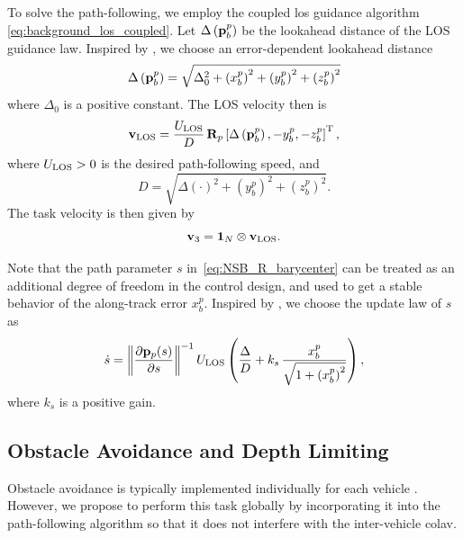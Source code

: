 To solve the path-following, we employ the coupled \gls{los} guidance algorithm \eqref{eq:background_los_coupled}.
Let $\Delta\left(\mathbf{p}_b^p\right)$ be the lookahead distance of the LOS guidance law.
Inspired by \cite{belleter_2019_observer}, we choose an error-dependent lookahead distance 
\begin{equation}
    \Delta\left(\mathbf{p}_b^p\right) = \sqrt{\Delta_0^2 + \left(x_b^p\right)^2 + \left(y_b^p\right)^2 + \left(z_b^p\right)^2}
    \label{eq:NSB_R_delta}
\end{equation}
where $\Delta_0$ is a positive constant.
The LOS velocity then is 
\begin{equation}
    \mathbf{v}_{\rm LOS} = \frac{U_{\rm LOS}}{D} \, \mathbf{R}_p\left[\Delta\left(\mathbf{p}_b^p\right), -y_b^p, -z_b^p\right]^{\mathrm{T}},
    \label{eq:NSB_R_v_LOS}
\end{equation}
where $U_{\rm LOS} > 0$ is the desired path-following speed, and 
\begin{equation}
    D = \sqrt{\Delta(\cdot)^2 + \left(y_b^p\right)^2 + \left(z_b^p\right)^2}.
\end{equation}
The task velocity is then given by 
\begin{equation}
    \mathbf{v}_3 = \mathbf{1}_N \otimes \mathbf{v}_{\rm LOS}.
    \label{eq:NSB_R_v_3}
\end{equation}

Note that the path parameter $s$ in~\eqref{eq:NSB_R_barycenter} can be treated as an additional degree of freedom in the control design, and used to get a stable behavior of the along-track error $x_b^p$. 
Inspired by \cite{belleter_2019_observer}, we choose the update law of $s$ as
\begin{equation}
    \dot{s} = \left\|\frac{\partial \mathbf{p}_p(s)}{\partial s}\right\|^{-1} U_{\rm LOS} \left(\frac{\Delta}{D} + k_{s}\,\frac{x_b^p}{\sqrt{1+\left(x_b^p\right)^2}}\right),\label{eq:NSB_R_path_update}
\end{equation}
where $k_{s}$ is a positive gain.


\subsection{Obstacle Avoidance and Depth Limiting}
\label{sec:NSB_R_OA}

Obstacle avoidance is typically implemented individually for each vehicle \cite{antonelli_2006_kinematic}.
However, we propose to perform this task globally by incorporating it into the path-following algorithm so that it does not interfere with the inter-vehicle \gls{colav}. %


